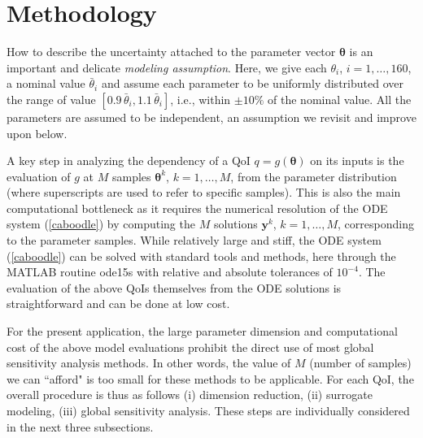 \section{Methodology}\label{sec:meth}

How to describe the uncertainty attached to the parameter vector $\boldsymbol{\theta}$ is an important and delicate {\sl modeling assumption}. Here, we give each $\theta_i$, $i=1,\dots, 160$, a nominal value $\bar \theta_i$ and assume each parameter to be uniformly distributed over the range of value $[0.9\, \bar\theta_i, 1.1 \,\bar\theta_i]$, i.e., within $\pm 10\%$ of the nominal value. All the parameters  are assumed to be independent, an assumption we revisit and improve upon below. 

A key  step in analyzing the dependency of a QoI $q = g(\boldsymbol{\theta})$ on its inputs is the evaluation of $g$ at $M$ samples $\boldsymbol\theta^k$, $k=1,\dots, M$, from the parameter distribution (where superscripts are used to refer to specific samples). 
This is also the  main  computational bottleneck as it requires the numerical resolution of  the ODE system (\ref{caboodle})  by computing the $M$ solutions $\mathbf y^k$, $k=1,\dots , M$, corresponding to  the parameter samples. 
While relatively large and stiff, the ODE system (\ref{caboodle}) can be  solved with standard tools and methods, here through the MATLAB routine ode15s  with relative and absolute tolerances of $10^{-4}$. The evaluation of the above QoIs themselves from the ODE solutions is straightforward and can be done at low cost.



For the present application, the large parameter dimension and computational cost of the above model evaluations prohibit the direct use of most global sensitivity analysis methods. In other words, the value of $M$ (number of samples)  we can ``afford" is too small for these methods to be applicable. 
For each QoI, the overall procedure is thus as follows (i) dimension reduction, (ii) surrogate modeling, (iii) global sensitivity analysis.
These steps are individually considered in the next three subsections. 




